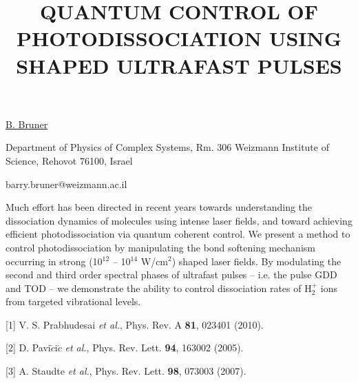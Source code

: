 \title{QUANTUM CONTROL OF PHOTODISSOCIATION USING SHAPED ULTRAFAST PULSES}

\underline{B. Bruner} 

{\normalsize{\vspace{-4mm}
Department of Physics of Complex Systems, Rm. 306 Weizmann Institute
of Science, Rehovot 76100, Israel

\email barry.bruner@weizmann.ac.il}}

Much effort has been directed in recent years towards understanding the dissociation dynamics of
molecules using intense laser fields, and toward achieving efficient photodissociation via quantum
coherent control. We present a method to control photodissociation by manipulating the bond
softening mechanism occurring in strong (10$^{12}$ -- 10$^{14}$ W/cm$^{2}$) shaped laser fields.  By
modulating the second and third order spectral phases of ultrafast pulses -- i.e. the pulse GDD and
TOD -- we demonstrate the ability to control dissociation rates of H$_{2}^{+}$ ions from targeted
vibrational levels.

{\normalsize
[1] V. S. Prabhudesai \textit{et al.}, Phys. Rev. A \textbf{81}, 023401 (2010).
\vsp

[2]  D. Pavi$\check{c}$i$\acute{c}$ \textit{et al.}, Phys. Rev. Lett. \textbf{94}, 163002 (2005).
\vsp

[3]  A. Staudte \textit{et al.}, Phys. Rev. Lett. \textbf{98}, 073003 (2007).
}

\vspace{\baselineskip} 